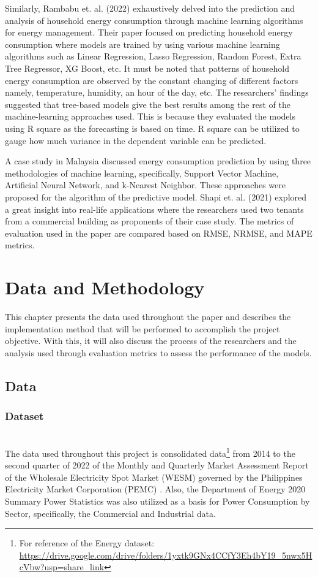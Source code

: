 \documentclass[runningheads]{llncs}
\begin{document}
Similarly, Rambabu et. al. (2022) exhaustively delved into the prediction and analysis of household energy consumption through machine learning algorithms for energy management. Their paper focused on predicting household energy consumption where models are trained by using various machine learning algorithms such as Linear Regression, Lasso Regression, Random Forest, Extra Tree Regressor, XG Boost, etc. It must be noted that patterns of household energy consumption are observed by the constant changing of different factors namely, temperature, humidity, an hour of the day, etc. The researchers’ findings suggested that tree-based models give the best results among the rest of the machine-learning approaches used. This is because they evaluated the models using R square as the forecasting is based on time. R square can be utilized to gauge how much variance in the dependent variable can be predicted. 

A case study in Malaysia discussed energy consumption prediction by using three methodologies of machine learning, specifically, Support Vector Machine, Artificial Neural Network, and k-Nearest Neighbor. These approaches were proposed for the algorithm of the predictive model. Shapi et. al. (2021) explored a great insight into real-life applications where the researchers used two tenants from a commercial building as proponents of their case study. The metrics of evaluation used in the paper are compared based on RMSE, NRMSE, and MAPE metrics.

\section{Data and Methodology}
This chapter presents the data used throughout the paper and describes the implementation method that will be performed to accomplish the project objective. With this, it will also discuss the process of the researchers and the analysis used through evaluation metrics to assess the performance of the models.
\subsection{Data}

\subsubsection{Dataset}~\\

The data used throughout this project is consolidated data\footnote{For reference of the Energy dataset:\\ 
\url{https://drive.google.com/drive/folders/1yxtk9GNx4CCfY3Eh4bY19\_5nwx5HcVbw?usp=share\_link}} from 2014 to the second quarter of 2022 of the Monthly and Quarterly Market Assessment Report of the Wholesale Electricity Spot Market (WESM) governed by the Philippines Electricity Market Corporation (PEMC) \cite{pemc}. Also, the Department of Energy 2020 Summary Power Statistics was also utilized as a basis for Power Consumption by Sector, specifically, the Commercial and Industrial data.
\end{document}
